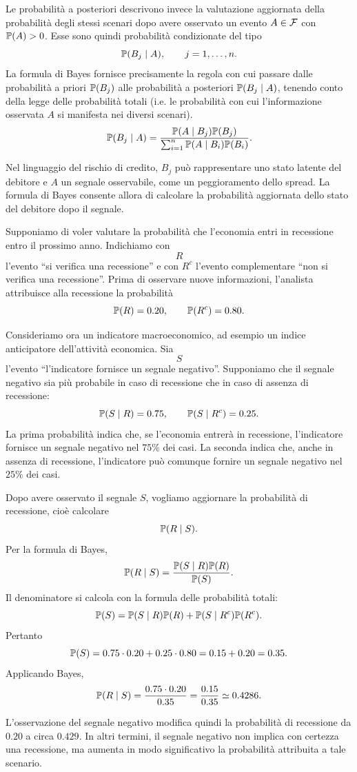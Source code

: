 Le probabilit\`{a} a posteriori descrivono invece la valutazione aggiornata
della probabilit\`{a} degli stessi scenari dopo avere osservato un evento
$A\in\mathcal{F}$ con $\mathbb{P}(A)>0$.
Esse sono quindi probabilit\`{a} condizionate del tipo
\[
\mathbb{P}(B_j\mid A),
\qquad j=1,\ldots,n.
\]
La formula di Bayes fornisce precisamente la regola con cui passare dalle
probabilit\`{a} a priori $\mathbb{P}(B_j)$ alle probabilit\`{a} a posteriori
$\mathbb{P}(B_j\mid A)$, tenendo conto della legge delle probabilit\`{a} totali (i.e. le probabilit\`{a} con cui l'informazione osservata $A$ si manifesta nei diversi scenari).
\[
\mathbb{P}(B_{j}\mid A) = \frac{\mathbb{P}(A\mid B_{j})\mathbb{P}(B_{j})}
{\sum_{i=1}^{n}\mathbb{P}(A\mid B_{i})\mathbb{P}(B_{i})}.
\]

Nel linguaggio del rischio di credito, $B_{j}$ pu\`{o} rappresentare uno stato
latente del debitore e $A$ un segnale osservabile, come un peggioramento dello
spread. La formula di Bayes consente allora di calcolare la probabilit\`{a}
aggiornata dello stato del debitore dopo il segnale.

\begin{example}

Supponiamo di voler valutare la probabilit\`{a} che l'economia entri in
recessione entro il prossimo anno. Indichiamo con
\[
R
\]
l'evento ``si verifica una recessione'' e con $R^c$ l'evento complementare
``non si verifica una recessione''. Prima di osservare nuove informazioni,
l'analista attribuisce alla recessione la probabilit\`{a}
\[
\mathbb{P}(R)=0.20,
\qquad
\mathbb{P}(R^c)=0.80.
\]

Consideriamo ora un indicatore macroeconomico, ad esempio un indice anticipatore
dell'attivit\`{a} economica. Sia
\[
S
\]
l'evento ``l'indicatore fornisce un segnale negativo''. Supponiamo che il
segnale negativo sia pi\`{u} probabile in caso di recessione che in caso di
assenza di recessione:
\[
\mathbb{P}(S\mid R)=0.75,
\qquad
\mathbb{P}(S\mid R^c)=0.25.
\]
La prima probabilit\`{a} indica che, se l'economia entrer\`{a} in recessione,
l'indicatore fornisce un segnale negativo nel $75\%$ dei casi. La seconda indica
che, anche in assenza di recessione, l'indicatore pu\`{o} comunque fornire un
segnale negativo nel $25\%$ dei casi.

Dopo avere osservato il segnale $S$, vogliamo aggiornare la probabilit\`{a} di
recessione, cio\`{e} calcolare
\[
\mathbb{P}(R\mid S).
\]
Per la formula di Bayes,
\[
\mathbb{P}(R\mid S)
=
\frac{\mathbb{P}(S\mid R)\mathbb{P}(R)}
{\mathbb{P}(S)}.
\]
Il denominatore si calcola con la formula delle probabilit\`{a} totali:
\[
\mathbb{P}(S)
=
\mathbb{P}(S\mid R)\mathbb{P}(R)
+
\mathbb{P}(S\mid R^c)\mathbb{P}(R^c).
\]
Pertanto
\[
\mathbb{P}(S)
=
0.75\cdot 0.20
+
0.25\cdot 0.80
=
0.15+0.20
=
0.35.
\]
Applicando Bayes,
\[
\mathbb{P}(R\mid S)
=
\frac{0.75\cdot 0.20}{0.35}
=
\frac{0.15}{0.35}
\simeq 0.4286.
\]

L'osservazione del segnale negativo modifica quindi la probabilit\`{a} di
recessione da $0.20$ a circa $0.429$. In altri termini, il segnale negativo non
implica con certezza una recessione, ma aumenta in modo significativo la
probabilit\`{a} attribuita a tale scenario.
    
\end{example}

